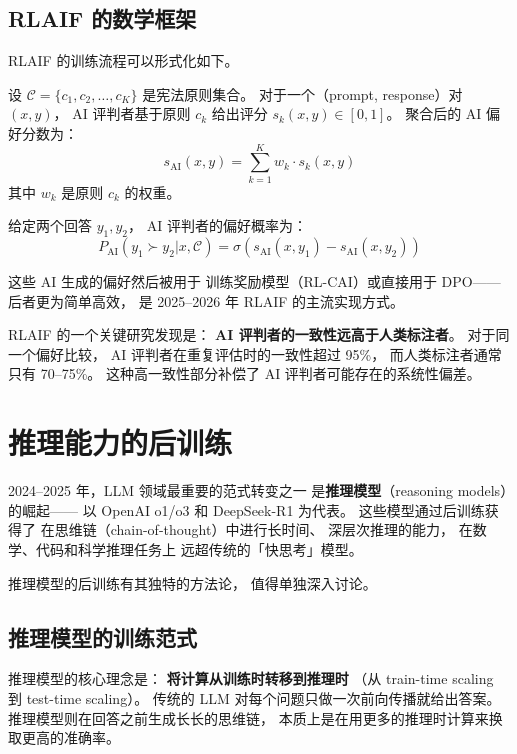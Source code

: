 \subsection{RLAIF 的数学框架}

RLAIF 的训练流程可以形式化如下。

设 $\mathcal{C} = \{c_1, c_2, \ldots, c_K\}$ 是宪法原则集合。
对于一个（prompt, response）对 $(x, y)$，
AI 评判者基于原则 $c_k$ 给出评分 $s_k(x, y) \in [0, 1]$。
聚合后的 AI 偏好分数为：
\begin{equation}
  s_{\text{AI}}(x, y) = \sum_{k=1}^{K} w_k \cdot s_k(x, y)
\end{equation}
其中 $w_k$ 是原则 $c_k$ 的权重。

给定两个回答 $y_1, y_2$，
AI 评判者的偏好概率为：
\begin{equation}
  P_{\text{AI}}(y_1 \succ y_2 | x, \mathcal{C}) =
  \sigma\!\left(s_{\text{AI}}(x, y_1) - s_{\text{AI}}(x, y_2)\right)
\end{equation}

这些 AI 生成的偏好然后被用于
训练奖励模型（RL-CAI）或直接用于 DPO——
后者更为简单高效，
是 2025--2026 年 RLAIF 的主流实现方式。

RLAIF 的一个关键研究发现是：
\textbf{AI 评判者的一致性远高于人类标注者}。
对于同一个偏好比较，
AI 评判者在重复评估时的一致性超过 95\%，
而人类标注者通常只有 70--75\%。
这种高一致性部分补偿了
AI 评判者可能存在的系统性偏差。

\section{推理能力的后训练}
\label{sec:reasoning-post-training}

2024--2025 年，LLM 领域最重要的范式转变之一
是\textbf{推理模型}（reasoning models）的崛起——
以 OpenAI o1/o3 和 DeepSeek-R1 为代表。
这些模型通过后训练获得了
在思维链（chain-of-thought）中进行长时间、
深层次推理的能力，
在数学、代码和科学推理任务上
远超传统的「快思考」模型。

推理模型的后训练有其独特的方法论，
值得单独深入讨论。

\subsection{推理模型的训练范式}

推理模型的核心理念是：
\textbf{将计算从训练时转移到推理时}
（从 train-time scaling 到 test-time scaling）。
传统的 LLM 对每个问题只做一次前向传播就给出答案。
推理模型则在回答之前生成长长的思维链，
本质上是在用更多的推理时计算来换取更高的准确率。

